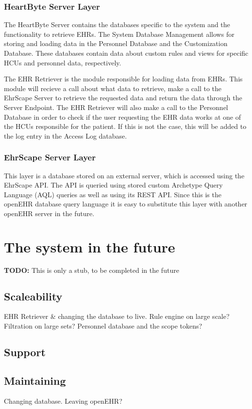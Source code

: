 \documentclass{article}
\begin{document}
\subsubsection{HeartByte Server Layer}
The HeartByte Server contains the databases specific to the system and the functionality to retrieve EHRs. The System Database Management allows for storing and loading data in the Personnel Database and the Customization Database. These databases contain data about custom rules and views for specific HCUs and personnel data, respectively.

The EHR Retriever is the module responsible for loading data from EHRs. This module will recieve a call about what data to retrieve, make a call to the EhrScape Server to retrieve the requested data and return the data through the Server Endpoint. The EHR Retriever will also make a call to the Personnel Database in order to check if the user requesting the EHR data works at one of the HCUs responsible for the patient. If this is not the case, this will be added to the log entry in the Access Log database.

\subsubsection{EhrScape Server Layer}
This layer is a database stored on an external server, which is accessed using the EhrScape API. The API is queried using stored custom Archetype Query Language (AQL) queries as well as using its REST API. Since this is the openEHR database query language it is easy to substitute this layer with another openEHR server in the future.


\section{The system in the future}
\textbf{TODO:} 
This is only a stub, to be completed in the future
\subsection{Scaleability}
EHR Retriever & changing the database to live. Rule engine on large scale? Filtration on large sets? Personnel database and the scope tokens?
\subsection{Support}
\subsection{Maintaining}
Changing database. Leaving openEHR? 
\end{document}
